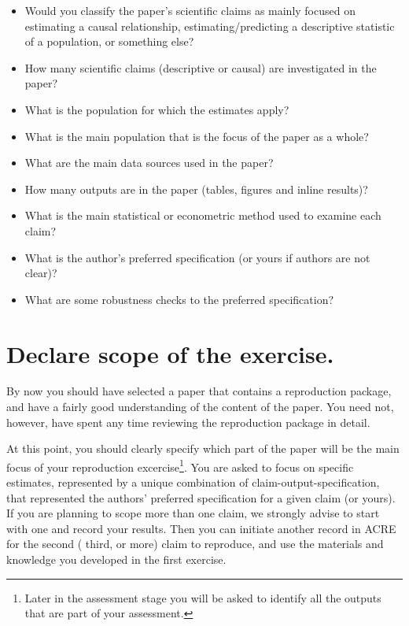 \documentclass[]{book}
\providecommand{\tightlist}{%
  \setlength{\itemsep}{0pt}\setlength{\parskip}{0pt}}
\begin{document}
\begin{itemize}
\tightlist
\item
  Would you classify the paper's scientific claims as mainly focused on estimating a causal relationship, estimating/predicting a descriptive statistic of a population, or something else?
\item
  How many scientific claims (descriptive or causal) are investigated in the paper?
\item
  What is the population for which the estimates apply?
\item
  What is the main population that is the focus of the paper as a whole?
\item
  What are the main data sources used in the paper?
\item
  How many outputs are in the paper (tables, figures and inline results)?\\
\item
  What is the main statistical or econometric method used to examine each claim?
\item
  What is the author's preferred specification (or yours if authors are not clear)?
\item
  What are some robustness checks to the preferred specification?
\end{itemize}

\hypertarget{declare-estimates}{%
\section{Declare scope of the exercise.}\label{declare-estimates}}

By now you should have selected a paper that contains a reproduction package, and have a fairly good understanding of the content of the paper. You need not, however, have spent any time reviewing the reproduction package in detail.

At this point, you should clearly specify which part of the paper will be the main focus of your reproduction excercise\footnote{Later in the assessment stage you will be asked to identify all the outputs that are part of your assessment.}. You are asked to focus on specific estimates, represented by a unique combination of claim-output-specification, that represented the authors' preferred specification for a given claim (or yours). If you are planning to scope more than one claim, we strongly advise to start with one and record your results. Then you can initiate another record in ACRE for the second ( third, or more) claim to reproduce, and use the materials and knowledge you developed in the first exercise.
\end{document}
